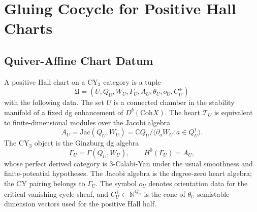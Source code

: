 
\providecommand{\Hom}{\mathrm{Hom}}
\providecommand{\End}{\mathrm{End}}
\providecommand{\Ext}{\mathrm{Ext}}
\providecommand{\Tor}{\mathrm{Tor}}
\providecommand{\Spec}{\mathrm{Spec}}
\providecommand{\Db}{D^{b}}
\providecommand{\Perf}{\mathrm{Perf}}
\providecommand{\Coh}{\mathrm{Coh}}
\providecommand{\CoHA}{\mathrm{CoHA}}
\providecommand{\Jac}{\mathrm{Jac}}
\providecommand{\Rep}{\mathrm{Rep}}
\providecommand{\Sym}{\mathrm{Sym}}
\providecommand{\Tr}{\mathrm{Tr}}
\providecommand{\cF}{\mathcal F}
\providecommand{\cZ}{\mathcal Z}
\providecommand{\sH}{\mathcal H}
\providecommand{\sM}{\mathcal M}
\providecommand{\sT}{\mathcal T}
\providecommand{\sE}{\mathcal E}
\providecommand{\bC}{\mathbb C}
\providecommand{\bZ}{\mathbb Z}
\providecommand{\bN}{\mathbb N}
\providecommand{\Eone}{E_1}
\providecommand{\Etwo}{E_2}
\providecommand{\Yp}{Y^{+}}
\providecommand{\kch}{\kappa_{\mathrm{ch}}}

\section*{Gluing Cocycle for Positive Hall Charts}

\subsection*{Quiver-Affine Chart Datum}

A positive Hall chart on a CY$_3$ category is a tuple
\[
  \mathfrak U
  =
  (U,Q_U,W_U,\Gamma_U,A_U,\theta_U,o_U,C_U^{+})
\]
with the following data. The set \(U\) is a connected chamber in the
stability manifold of a fixed dg enhancement of \(\Db(\Coh X)\). The
heart \(\sT_U\) is equivalent to finite-dimensional modules over the
Jacobi algebra
\[
  A_U
  =
  \Jac(Q_U,W_U)
  =
  \bC Q_U\Big/
  \big\langle \partial_a W_U : a \in Q_U^1\big\rangle .
\]
The CY$_3$ object is the Ginzburg dg algebra
\[
  \Gamma_U=\Gamma(Q_U,W_U), \qquad H^0(\Gamma_U)=A_U,
\]
whose perfect derived category is \(3\)-Calabi-Yau under the usual
smoothness and finite-potential hypotheses. The Jacobi algebra is the
degree-zero heart algebra; the CY pairing belongs to \(\Gamma_U\).
The symbol \(o_U\) denotes orientation data for the critical
vanishing-cycle sheaf, and \(C_U^{+}\subset \bN^{Q_U^0}\) is the cone of
\(\theta_U\)-semistable dimension vectors used for the positive Hall
half.

